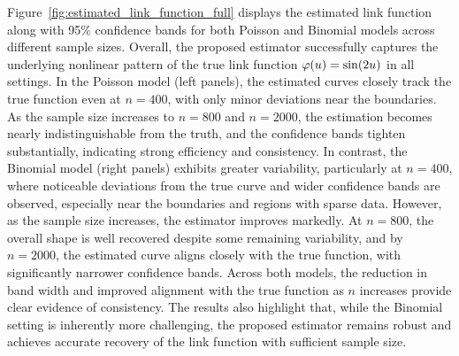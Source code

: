 Figure~\ref{fig:estimated_link_function_full} displays the estimated link function along with 95\% confidence bands for both Poisson and Binomial models across different sample sizes. Overall, the proposed estimator successfully captures the underlying nonlinear pattern of the true link function $\varphi(u)=\sin(2u)$ in all settings. 
In the Poisson model (left panels), the estimated curves closely track the true function even at $n=400$, with only minor deviations near the boundaries. As the sample size increases to $n=800$ and $n=2000$, the estimation becomes nearly indistinguishable from the truth, and the confidence bands tighten substantially, indicating strong efficiency and consistency.
In contrast, the Binomial model (right panels) exhibits greater variability, particularly at $n=400$, where noticeable deviations from the true curve and wider confidence bands are observed, especially near the boundaries and regions with sparse data. However, as the sample size increases, the estimator improves markedly. At $n=800$, the overall shape is well recovered despite some remaining variability, and by $n=2000$, the estimated curve aligns closely with the true function, with significantly narrower confidence bands.
Across both models, the reduction in band width and improved alignment with the true function as $n$ increases provide clear evidence of consistency. The results also highlight that, while the Binomial setting is inherently more challenging, the proposed estimator remains robust and achieves accurate recovery of the link function with sufficient sample size.



